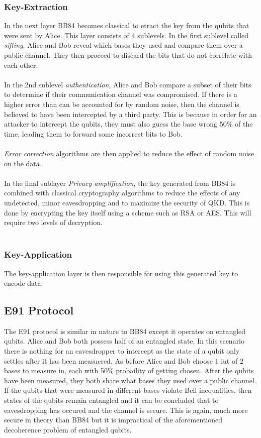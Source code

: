 \documentclass[journal]{IEEEtran}
\begin{document}
\subsubsection{Key-Extraction}
In the next layer BB84 becomes classical to etract the key from the qubits that were sent by Alice. This layer consists of 4 sublevels. In the first sublevel called \emph{sifting}, Alice and Bob reveal which bases they used and compare them over a public channel.
They then proceed to discard the bits that do not correlate with each other. \\ \\
In the 2nd sublevel \emph{authentication}, Alice and Bob compare a subset of their bits to determine if their communication channel was compromised. If there is a higher error than can be accounted for by random noise, then the channel is believed to have been intercepted by a third party. This is because in order for an attacker to intercept the qubits, 
they must also guess the base wrong 50\% of the time, leading them to forward some incorrect bits to Bob. \\ \\
\emph{Error correction} algorithms are then applied to reduce the effect of random noise on the data. \\ \\
In the final sublayer \emph{Privacy amplification}, the key generated from BB84 is combined with classical cryptography algorithms to reduce the effects of any undetected, minor eavesdropping and to maximize the security of QKD. This is done by encrypting the key itself using a scheme such as RSA or AES. This will require two levels of decryption. \\ \\
\subsubsection{Key-Application}
The key-application layer is then responsible for using this generated key to encode data.
\subsection{E91 Protocol}
The E91 protocol is similar in nature to BB84 except it operates on entangled qubits. Alice and Bob both possess half of an entangled state. In this scenario there is nothing for an eavesdropper to intercept as the state of a qubit only settles after it has been measuered. As before Alice and Bob choose 1 iut of 2 bases to measure in, each with 50\% probaility of getting chosen.
After the qubits have been measured, they both share what bases they used over a public channel. If the qubits that were measured in different bases violate Bell inequalities, then states of the qubits remain entangled and it can be concluded that to eavesdropping has occured and the channel is secure. This is again, much more secure in theory than BB84 but it is impractical of the aforementioned
decoherence problem of entangled qubits.
\end{document}
